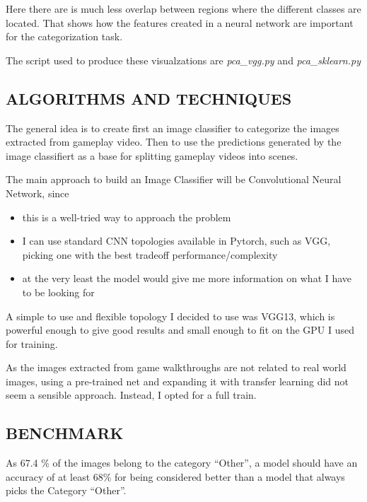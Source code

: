 \documentclass[
]{article}
\providecommand{\tightlist}{%
  \setlength{\itemsep}{0pt}\setlength{\parskip}{0pt}}
\begin{document}
Here there are is much less overlap between regions where the different
classes are located. That shows how the features created in a neural network are
important for the categorization task.

The script used to produce these visualzations are \emph{pca\_vgg.py} and \emph{pca\_sklearn.py}  

\hypertarget{algorithms-and-techniques}{%
\subsection{ALGORITHMS AND
TECHNIQUES}\label{algorithms-and-techniques}}

The general idea is to create first an image classifier to categorize the
images extracted from gameplay video. Then to use the predictions generated by the image classifiert as a base for splitting gameplay videos into scenes.

The main approach to build an Image Classifier will be  Convolutional
Neural Network, since

\begin{itemize}
\tightlist
\item
  this is a well-tried way to approach the problem
\item
  I can use standard CNN topologies available in Pytorch, such as VGG,
  picking one with the best tradeoff performance/complexity
\item
  at the very least the model would give me more information on
  what I have to be looking for
\end{itemize}

A simple to use and flexible topology I decided to use was VGG13, which is
powerful enough to give good results and small enough to fit on the GPU I used for training.

As the images extracted from game walkthroughs are not related to real
world images, using a pre-trained net and expanding it with transfer
learning did not seem a sensible approach. Instead, I opted for a full
train.

\hypertarget{benchmark}{%
\subsection{BENCHMARK}\label{benchmark}}

As 67.4 \% of the images belong to the category ``Other'', a model
should have an accuracy of at least 68\% for being considered better
than a model that always picks the Category ``Other''.
\end{document}
